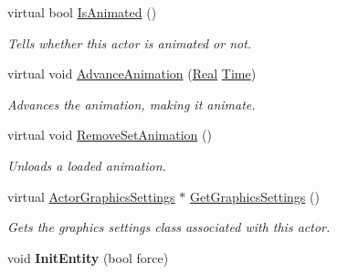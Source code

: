 \begin{DoxyCompactItemize}
virtual bool \hyperlink{classphys_1_1ActorBase_ac98f9fdae0da939e352f8fcff217457c}{IsAnimated} ()
\begin{DoxyCompactList}\small\item\em Tells whether this actor is animated or not. \item\end{DoxyCompactList}\item 
virtual void \hyperlink{classphys_1_1ActorBase_a37d5a8a3ae4ca3c6e7d14706096faa85}{AdvanceAnimation} (\hyperlink{namespacephys_af7eb897198d265b8e868f45240230d5f}{Real} \hyperlink{structphys_1_1Time}{Time})
\begin{DoxyCompactList}\small\item\em Advances the animation, making it animate. \item\end{DoxyCompactList}\item 
virtual void \hyperlink{classphys_1_1ActorBase_ac42e5e47504d7f296bb0a2bedc2ded07}{RemoveSetAnimation} ()
\begin{DoxyCompactList}\small\item\em Unloads a loaded animation. \item\end{DoxyCompactList}\item 
virtual \hyperlink{classphys_1_1ActorGraphicsSettings}{ActorGraphicsSettings} $\ast$ \hyperlink{classphys_1_1ActorBase_abaa77d8b4a7aecda0125f91757a97edf}{GetGraphicsSettings} ()
\begin{DoxyCompactList}\small\item\em Gets the graphics settings class associated with this actor. \item\end{DoxyCompactList}\item 
\hypertarget{classphys_1_1ActorBase_ac79a6383ea52a99d51e8b4445a0bc2da}{
void {\bfseries InitEntity} (bool force)}
\label{d8/d0f/classphys_1_1ActorBase_ac79a6383ea52a99d51e8b4445a0bc2da}


\end{DoxyCompactItemize}
